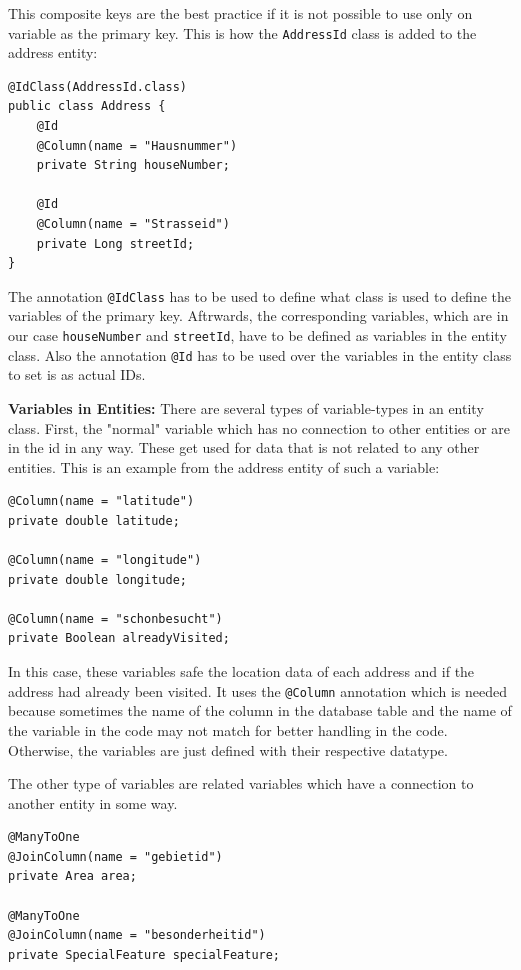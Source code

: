     This composite keys are the best practice if it is not possible to use only on variable as the primary key. This is how the \texttt{AddressId} class is added to the address entity: 
    \lstset{style=mycsharp, caption=IDs in Address-Entity}
    \begin{lstlisting}
@IdClass(AddressId.class)
public class Address {
    @Id
    @Column(name = "Hausnummer")
    private String houseNumber;

    @Id
    @Column(name = "Strasseid")
    private Long streetId;
}                         
    \end{lstlisting} 
    The annotation \texttt{@IdClass} has to be used to define what class is used to define the variables of the primary key. Aftrwards, the corresponding variables, which are in our case \texttt{houseNumber} and \texttt{streetId}, have to be defined as variables in the entity class. Also the annotation \texttt{@Id} has to be used over the variables in the entity class to set is as actual IDs. \newline 

    \textbf{Variables in Entities:} \newline
    There are several types of variable-types in an entity class. First, the "normal" variable which has no connection to other entities or are in the id in any way. These get used for data that is not related to any other entities. This is an example from the address entity of such a variable:
    \lstset{style=mycsharp, caption="Normal" Variable}
    \begin{lstlisting}
@Column(name = "latitude")
private double latitude;
    
@Column(name = "longitude")
private double longitude;
    
@Column(name = "schonbesucht")
private Boolean alreadyVisited;                     
    \end{lstlisting} 
    In this case, these variables safe the location data of each address and if the address had already been visited. It uses the \texttt{@Column} annotation which is needed because sometimes the name of the column in the database table and the name of the variable in the code may not match for better handling in the code. Otherwise, the variables are just defined with their respective datatype. \newline

    The other type of variables are related variables which have a connection to another entity in some way.
    \lstset{style=mycsharp, caption=ManyToOne Variable}
    \begin{lstlisting}
@ManyToOne
@JoinColumn(name = "gebietid")
private Area area;
    
@ManyToOne
@JoinColumn(name = "besonderheitid")
private SpecialFeature specialFeature;                    
    \end{lstlisting} 

